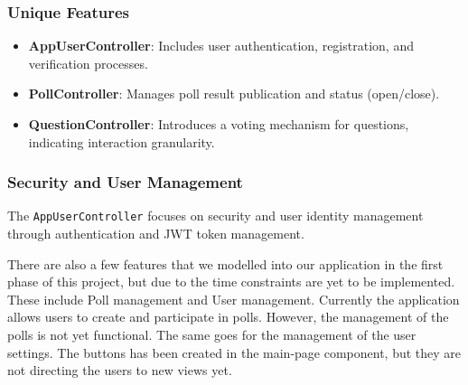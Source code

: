 \subsubsection{Unique Features}
\begin{itemize}
    \item \textbf{AppUserController}: Includes user authentication, registration, and verification processes.
    \item \textbf{PollController}: Manages poll result publication and status (open/close).
    \item \textbf{QuestionController}: Introduces a voting mechanism for questions, indicating interaction granularity.
\end{itemize}

\subsubsection{Security and User Management}
The \texttt{AppUserController} focuses on security and user identity management through authentication and JWT token management.

\hfill \break

There are also a few features that we modelled into our application in the first phase of this project,
but due to the time constraints are yet to be implemented. These include Poll management and User
management. Currently the application allows users to create and participate in polls. However, the
management of the polls is not yet functional. The same goes for the management of the user
settings. The buttons has been created in the main-page component, but they are not directing the
users to new views yet.